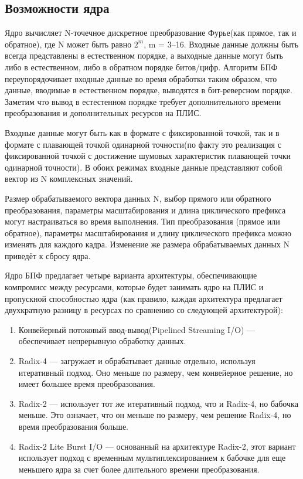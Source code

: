 \subsection{Возможности ядра}

Ядро вычисляет N-точечное дискретное преобразование Фурье(как прямое, так и обратное), где N может быть равно $2^m$, m = 3–16. Входные данные должны быть всегда представлены в естественном порядке, а выходные данные могут быть либо в естественном, либо в обратном порядке битов/цифр. Алгоритм БПФ переупорядочивает входные данные во время обработки таким образом, что данные, вводимые в естественном порядке, выводятся в бит-реверсном порядке. Заметим что вывод в естестенном порядке требует дополнительного времени преобразования и дополнительных ресурсов на ПЛИС.  

Входные данные могут быть как в формате с фиксированной точкой, так и в формате с плавающей точкой одинарной точности(по факту это реализация с фиксированной точкой с достижение шумовых характеристик плавающей точки одинарной точности). В обоих режимах входные данные представляют собой вектор из N комплексных значений. 

Размер обрабатываемого вектора данных N, выбор прямого или обратного преобразования, параметры масштабирования и длина циклического префикса могут настраиваться во время выполнения. Тип преобразования (прямое или обратное), параметры масштабирования и длину циклического префикса можно изменять для каждого кадра. Изменение же размера обрабатываемых данных N приведёт к сбросу ядра. 

Ядро БПФ предлагает четыре варианта архитектуры, обеспечивающие компромисс между ресурсами, которые будет занимать ядро на ПЛИС и пропускной способностью ядра (как правило, каждая архитектура предлагает двухкратную разницу в ресурсах по сравнению со следующей архитектурой): 

\begin{enumerate}
	\item Конвейерный потоковый ввод-вывод(Pipelined Streaming I/O) — обеспечивает непрерывную обработку данных. 
	\item Radix-4 — загружает и обрабатывает данные отдельно, используя итеративный подход. Оно меньше по размеру, чем конвейерное решение, но имеет большее время преобразования. 
	\item Radix-2 — использует тот же итеративный подход, что и Radix-4, но бабочка меньше. Это означает, что он меньше по размеру, чем решение Radix-4, но время преобразования больше. 
	\item Radix-2 Lite Burst I/O — основанный на архитектуре Radix-2, этот вариант использует подход с временным мультиплексированием к бабочке для еще меньшего ядра за счет более длительного времени преобразования.
\end{enumerate} 

